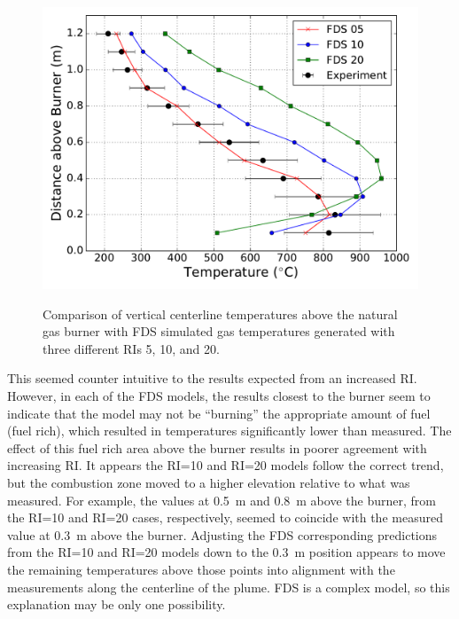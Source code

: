\documentclass[twoside]{uocthesis}
\begin{document}
{\begin{figure}[h!]
	\includegraphics[width=5in]{../Figures/FHNG01_RI} \\
	\caption[Comparison of vertical centerline temperatures above the natural gas burner with FDS simulated gas temperatures.]{Comparison of vertical centerline temperatures above the natural gas burner with FDS simulated gas temperatures generated with three different RIs 5, 10, and 20.}
	\label{FHNG01_RI}
\end{figure}

This seemed counter intuitive to the results expected from an increased RI.  However, in each of the FDS models, the results closest to the burner seem to indicate that the model may not be ``burning'' the appropriate amount of fuel (fuel rich), which resulted in temperatures significantly lower than measured.  The effect of this fuel rich area above the burner results in poorer agreement with increasing RI.  It appears the RI=10 and RI=20 models follow the correct trend, but the combustion zone moved to a higher elevation relative to what was measured.  For example, the values at 0.5~m and 0.8~m above the burner, from the RI=10 and RI=20 cases, respectively, seemed to coincide with the measured value at 0.3~m above the burner.  Adjusting the FDS corresponding predictions from the RI=10 and RI=20 models down to the 0.3~m position appears to move the remaining temperatures above those points into alignment with the measurements along the centerline of the plume. FDS is a complex model, so this explanation may be only one possibility. 

}
\end{document}
